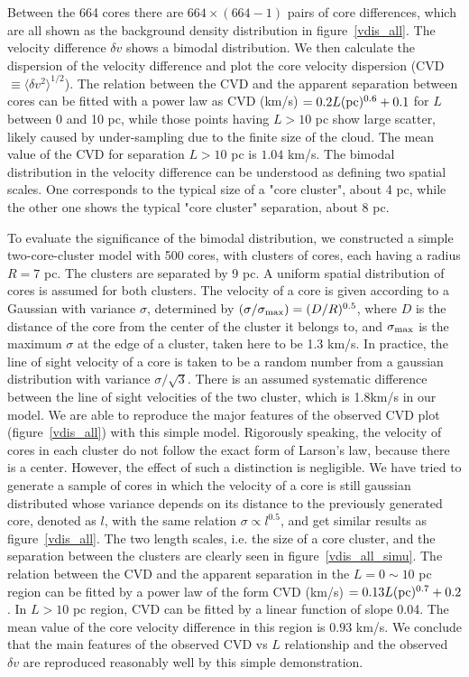 \documentclass[12pt,preprint]{aastex}
\begin{document}
Between the 664 cores there are $664\times(664-1)$ pairs of core differences, which are all shown as the background density distribution in figure~\ref{vdis_all}.
The velocity difference $\delta v$ shows a bimodal distribution.
We then calculate the dispersion of the velocity difference and plot the core velocity dispersion (CVD $\equiv \langle\delta v^2\rangle^{1/2}$).
The relation between the CVD and the apparent separation
between cores can be fitted with a power law as CVD (km/s) $=0.2L ({\rm pc})^{0.6}+0.1$ for
$L$ between 0 and 10 pc, while those points having $L>10$ pc  show large scatter, likely caused by under-sampling
due to the finite size of the cloud. The mean value of the CVD for separation $L>10$ pc is $1.04$ km/s.
The bimodal distribution in the velocity difference can be understood as defining two spatial scales.
One corresponds to the typical size of a "core cluster", about 4 pc, while the other one shows the typical  "core cluster" separation, about 8 pc.

To evaluate the significance of the bimodal distribution, we constructed a simple two-core-cluster model with 500 cores, with clusters of cores, each having a radius $R=7$ pc.
The clusters are separated by 9 pc.
A uniform spatial distribution of cores is assumed for both clusters.
The velocity of a core is given according to a Gaussian  with variance $\sigma$, determined by
$(\sigma/\sigma_{\rm max}) = (D/R)^{0.5}$, where $D$ is the distance of
the core from the center of the cluster it belongs to, and $\sigma_{\rm max}$ is the maximum $\sigma$ at the edge of a cluster, taken here to be
1.3 km/s. In practice,
the line of sight velocity of a core is taken to be a random number from a gaussian
distribution with variance $\sigma/\sqrt{3}$.
There is an assumed systematic difference between the line of sight velocities of the two cluster, which is 1.8km/s in our model.
We are able to reproduce the major features
of the observed CVD plot (figure~\ref{vdis_all}) with this simple model. Rigorously speaking, the velocity of cores in each cluster do
not follow the exact form of  Larson's law, because there is a center. However, the effect of such a distinction is negligible. We have tried to generate a sample of
cores in which the velocity of a core is still gaussian distributed whose variance depends on its distance to the previously generated core, denoted as $l$, with
the same relation $\sigma \propto l^{0.5}$, and get similar results as figure~\ref{vdis_all}.
The two length scales, i.e. the size of a core cluster, and the separation between the clusters are clearly seen in figure~\ref{vdis_all_simu}.
The relation between the CVD and the apparent separation in the $L=0\sim 10$ pc region can be fitted by a power law of the form CVD (km/s) $=0.13L ({\rm pc})^{0.7}+0.2$.
In $L>10$ pc region, CVD can be fitted by a linear function of  slope 0.04. The mean value of the core velocity difference in this region is $0.93$ km/s.
We conclude that the main features of the observed CVD vs $L$ relationship and the observed $\delta v$ are reproduced reasonably well by this simple demonstration.
\end{document}
